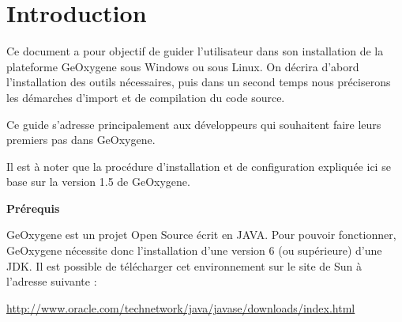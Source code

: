 \chapter{Introduction}

Ce document a pour objectif de guider l'utilisateur dans son installation de la plateforme GeOxygene sous Windows ou sous Linux. On décrira d'abord l'installation des outils nécessaires, puis dans un second temps nous préciserons les démarches d'import et de compilation du code source. 

\bigskip

\noindent
Ce guide s'adresse principalement aux développeurs qui souhaitent faire leurs premiers pas dans GeOxygene.

\bigskip
\noindent
Il est à noter que la procédure d'installation et de configuration expliquée ici se base sur la version 1.5 de GeOxygene.

\bigskip

\begin{flushleft}
    \bf
    Prérequis
\end{flushleft}

\noindent
GeOxygene est un projet Open Source écrit en JAVA. Pour pouvoir fonctionner, GeOxygene nécessite donc l'installation d'une version 6 (ou supérieure) d'une JDK. Il est possible de télécharger cet environnement sur le site de Sun à l'adresse suivante :

\bigskip

\begin{center}
\href{http://www.oracle.com/technetwork/java/javase/downloads/index.html}{http://www.oracle.com/technetwork/java/javase/downloads/index.html}
\end{center}
